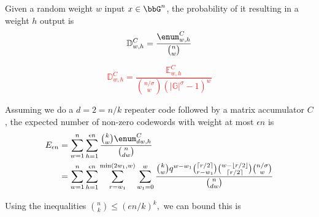 Given a random weight $w$ input $x\in \bbG^n$, the probability of it resulting in a weight $h$ output is
$$
\mathbb{D}_{w,h}^C = \frac{\enum^{C}_{w,h}}{{n\choose w}}
$$

\textcolor{red}{$$\mathbb{D}_{w, h}^{C} = \frac{\mathbb{E}_{w, h}^{C}}{\binom{n/\sigma}{w}(|\mathbb{G}|^{\sigma} - 1)^{w}}$$}

Assuming we do a $d=2=n/k$ repeater code followed by a matrix accumulator $C$, the expected number of non-zero codewords with weight at most $\epsilon n$ is
\begin{align*}
    E_{\epsilon n} &= \sum_{w=1}^n\sum_{h=1}^{\epsilon n} \frac{{k\choose w}\enum^C_{dw,h}}{{n\choose dw}}\\
    &=
    \sum_{w=1}^n
    \sum_{h=1}^{\epsilon n}
    \sum_{r=w_1}^{\min(2w_1,w)} \sum_{w_1 = 0}^{w}   \frac{{k\choose w} q^{w-w_1}  {\lceil r/2\rceil \choose r-w_1} {w-\lfloor r/2\rfloor \choose \lceil r/2\rceil} {n/\sigma \choose w} }{{n\choose dw}}
\end{align*}

Using the inequalities ${n\choose k}\leq (en/k)^k,$ we can bound this is